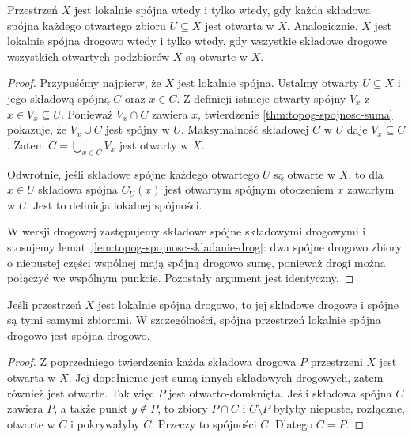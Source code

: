 \begin{twierdzenie}
\label{thm:topog-spojnosc-lokalna-komponenty}
Przestrzeń $X$ jest lokalnie spójna wtedy
i tylko wtedy, gdy każda składowa spójna
każdego otwartego zbioru $U\subseteq X$
jest otwarta w $X$.
Analogicznie, $X$ jest lokalnie spójna
drogowo wtedy i tylko wtedy, gdy wszystkie
składowe drogowe wszystkich otwartych
podzbiorów $X$ są otwarte w $X$.
\end{twierdzenie}
\begin{proof}
Przypuśćmy najpierw, że $X$ jest lokalnie
spójna. Ustalmy otwarty $U\subseteq X$
i jego składową spójną $C$ oraz $x\in C$.
Z definicji istnieje otwarty spójny $V_x$
z $x\in V_x\subseteq U$. Ponieważ
$V_x\cap C$ zawiera $x$, twierdzenie
\ref{thm:topog-spojnosc-suma} pokazuje,
że $V_x\cup C$ jest spójny w $U$.
Maksymalność składowej $C$ w $U$ daje
$V_x\subseteq C$. Zatem
$C=\bigcup_{x\in C}V_x$ jest otwarty w $X$.

Odwrotnie, jeśli składowe spójne każdego
otwartego $U$ są otwarte w $X$, to dla
$x\in U$ składowa spójna $C_U(x)$ jest
otwartym spójnym otoczeniem $x$ zawartym
w $U$. Jest to definicja lokalnej spójności.

W wersji drogowej zastępujemy składowe
spójne składowymi drogowymi i stosujemy
lemat~\ref{lem:topog-spojnosc-skladanie-drog}:
dwa spójne drogowo zbiory o niepustej części
wspólnej mają spójną drogowo sumę, ponieważ
drogi można połączyć we wspólnym punkcie.
Pozostały argument jest identyczny.
\end{proof}

\begin{wniosek}
\label{cor:topog-spojnosc-lokalna-drogowa}
Jeśli przestrzeń $X$ jest lokalnie spójna
drogowo, to jej składowe drogowe i spójne
są tymi samymi zbiorami. W szczególności,
spójna przestrzeń lokalnie spójna drogowo
jest spójna drogowo.
\end{wniosek}
\begin{proof}
Z poprzedniego twierdzenia każda składowa
drogowa $P$ przestrzeni $X$ jest otwarta
w $X$. Jej dopełnienie jest sumą innych
składowych drogowych, zatem również jest
otwarte. Tak więc $P$ jest otwarto-domknięta.
Jeśli składowa spójna $C$ zawiera $P$,
a także punkt $y\notin P$, to zbiory
$P\cap C$ i $C\setminus P$ byłyby
niepuste, rozłączne, otwarte w $C$
i pokrywałyby $C$. Przeczy to spójności $C$.
Dlatego $C=P$.
\end{proof}

